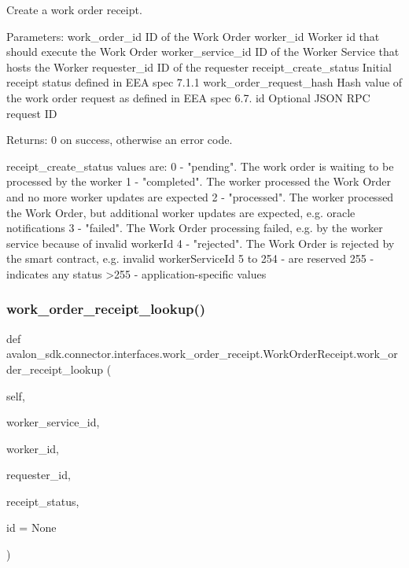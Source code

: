 \begin{DoxyVerb}Create a work order receipt.

Parameters:
work_order_id           ID of the Work Order
worker_id               Worker id that should execute the Work Order
worker_service_id       ID of the Worker Service that
                hosts the Worker
requester_id            ID of the requester
receipt_create_status   Initial receipt status defined
                in EEA spec 7.1.1
work_order_request_hash Hash value of the work order request as
                defined in EEA spec 6.7.
id                      Optional JSON RPC request ID

Returns:
0 on success, otherwise an error code.

receipt_create_status values are:
0 - "pending". The work order is waiting to be processed by the
    worker
1 - "completed". The worker processed the Work Order and no more
    worker updates are expected
2 - "processed". The worker processed the Work Order, but
    additional worker updates are expected,
    e.g. oracle notifications
3 - "failed". The Work Order processing failed,
    e.g. by the worker service because of invalid workerId
4 - "rejected". The Work Order is rejected by the smart contract,
    e.g. invalid workerServiceId
5 to 254 - are reserved
255      - indicates any status
>255     - application-specific values
\end{DoxyVerb}
 \mbox{\label{classavalon__sdk_1_1connector_1_1interfaces_1_1work__order__receipt_1_1WorkOrderReceipt_add7d65c68d7c3c96595fb0fe5bc7aa56}} 
\subsubsection{\texorpdfstring{work\+\_\+order\+\_\+receipt\+\_\+lookup()}{work\_order\_receipt\_lookup()}}
{\footnotesize\ttfamily def avalon\+\_\+sdk.\+connector.\+interfaces.\+work\+\_\+order\+\_\+receipt.\+Work\+Order\+Receipt.\+work\+\_\+order\+\_\+receipt\+\_\+lookup (\begin{DoxyParamCaption}\item[{}]{self,  }\item[{}]{worker\+\_\+service\+\_\+id,  }\item[{}]{worker\+\_\+id,  }\item[{}]{requester\+\_\+id,  }\item[{}]{receipt\+\_\+status,  }\item[{}]{id = {\ttfamily None} }\end{DoxyParamCaption})}


